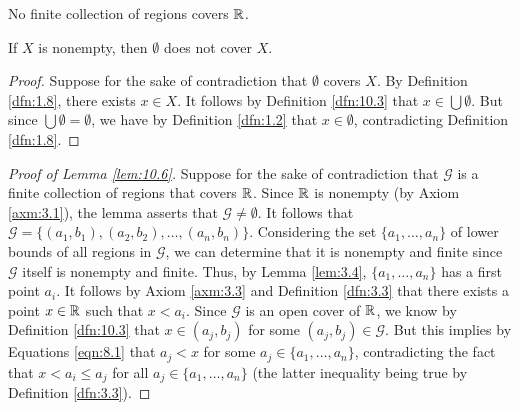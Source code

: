 \documentclass[../main.tex]{subfiles}
\begin{document}
\begin{lemma}\label{lem:10.6}
    No finite collection of regions covers $\mathbb{R}$.
    \begin{lemma*}
        If $X$ is nonempty, then $\emptyset$ does not cover $X$.
        \begin{proof}
            Suppose for the sake of contradiction that $\emptyset$ covers $X$. By Definition \ref{dfn:1.8}, there exists $x\in X$. It follows by Definition \ref{dfn:10.3} that $x\in\bigcup\emptyset$. But since $\bigcup\emptyset=\emptyset$, we have by Definition \ref{dfn:1.2} that $x\in\emptyset$, contradicting Definition \ref{dfn:1.8}.
        \end{proof}
    \end{lemma*}
    \begin{proof}[Proof of Lemma \ref{lem:10.6}]
        Suppose for the sake of contradiction that $\mathcal{G}$ is a finite collection of regions that covers $\mathbb{R}$. Since $\mathbb{R}$ is nonempty (by Axiom \ref{axm:3.1}), the lemma asserts that $\mathcal{G}\neq\emptyset$. It follows that $\mathcal{G}=\{(a_1,b_1),(a_2,b_2),\dots,(a_n,b_n)\}$. Considering the set $\{a_1,\dots,a_n\}$ of lower bounds of all regions in $\mathcal{G}$, we can determine that it is nonempty and finite since $\mathcal{G}$ itself is nonempty and finite. Thus, by Lemma \ref{lem:3.4}, $\{a_1,\dots,a_n\}$ has a first point $a_i$. It follows by Axiom \ref{axm:3.3} and Definition \ref{dfn:3.3} that there exists a point $x\in\mathbb{R}$ such that $x<a_i$. Since $\mathcal{G}$ is an open cover of $\mathbb{R}$, we know by Definition \ref{dfn:10.3} that $x\in(a_j,b_j)$ for some $(a_j,b_j)\in\mathcal{G}$. But this implies by Equations \ref{eqn:8.1} that $a_j<x$ for some $a_j\in\{a_1,\dots,a_n\}$, contradicting the fact that $x<a_i\leq a_j$ for all $a_j\in\{a_1,\dots,a_n\}$ (the latter inequality being true by Definition \ref{dfn:3.3}).
    \end{proof}
\end{lemma}
\end{document}
